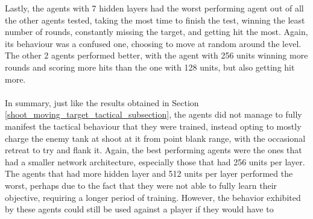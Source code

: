 Lastly, the agents with 7 hidden layers had the worst performing agent out of all the other agents tested, taking the most time to finish the test, winning the least number of rounds, constantly missing the target, and getting hit the most. Again, its behaviour was a confused one, choosing to move at random around the level. The other 2 agents performed better, with the agent with 256 units winning more rounds and scoring more hits than the one with 128 units, but also getting hit more.

\paragraph{}
In summary, just like the results obtained in Section \ref{shoot_moving_target_tactical_subsection}, the agents did not manage to fully manifest the tactical behaviour that they were trained, instead opting to mostly charge the enemy tank at shoot at it from point blank range, with the occasional retreat to try and flank it. Again, the best performing agents were the ones that had a smaller network architecture, especially those that had 256 units per layer. The agents that had more hidden layer and 512 units per layer performed the worst, perhaps due to the fact that they were not able to fully learn their objective, requiring a longer period of training. However, the behavior exhibited by these agents could still be used against a player if they would have to 

